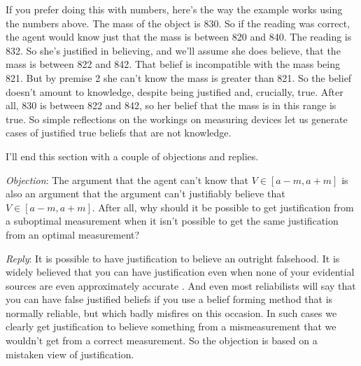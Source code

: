 If you prefer doing this with numbers, here's the way the example works using the numbers above. The mass of the object is 830. So if the reading was correct, the agent would know just that the mass is between 820 and 840. The reading is 832. So she's justified in believing, and we'll assume she does believe, that the mass is between 822 and 842. That belief is incompatible with the mass being 821. But by premise 2 she can't know the mass is greater than 821. So the belief doesn't amount to knowledge, despite being justified and, crucially, true. After all, 830 is between 822 and 842, so her belief that the mass is in this range is true. So simple reflections on the workings on measuring devices let us generate cases of justified true beliefs that are not knowledge.

I'll end this section with a couple of objections and replies.

\providecommand{\objrep}[2]{
\bigskip
\noindent \textit{Objection}: #1

\medskip
\noindent \textit{Reply}: #2

}

\objrep{The argument that the agent can't know that $V \in [a - m, a + m]$ is also an argument that the argument can't justifiably believe that $V \in [a - m, a + m]$. After all, why should it be possible to get justification from a suboptimal measurement when it isn't possible to get the same justification from an optimal measurement?}
{It is possible to have justification to believe an outright falsehood. It is widely believed that you can have justification even when none of your evidential sources are even approximately accurate \citep{Cohen1984}. And even most reliabilists will say that you can have false justified beliefs if you use a belief forming method that is normally reliable, but which badly misfires on this occasion. In such cases we clearly get justification to believe something from a mismeasurement that we wouldn't get from a correct measurement. So the objection is based on a mistaken view of justification.}

